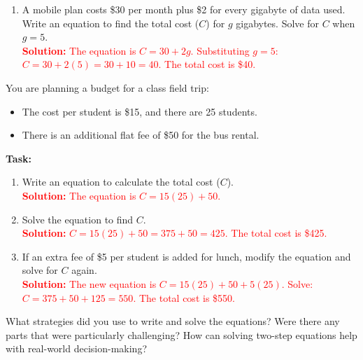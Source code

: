 \documentclass[12pt]{article}
\begin{document}
\begin{tcolorbox}[colframe=black!60, colback=white, 
coltitle=black, colbacktitle=black!15, fonttitle=\bfseries\Large, 
title=Problems, halign title=center, left=10pt, right=10pt, top=10pt, bottom=60pt]
\begin{enumerate}[start=9, itemsep=5em]
    \item A mobile plan costs \$30 per month plus \$2 for every gigabyte of data used. Write an equation to find the total cost (\(C\)) for \(g\) gigabytes. Solve for \(C\) when \(g = 5\).\\
    \textcolor{red}{\textbf{Solution:} The equation is \( C = 30 + 2g \). Substituting \( g = 5 \): \( C = 30 + 2(5) = 30 + 10 = 40 \). The total cost is \$40.}
\end{enumerate}
\end{tcolorbox}

\vspace{1em}

\begin{tcolorbox}[colframe=black!60, colback=white, 
coltitle=black, colbacktitle=black!15, fonttitle=\bfseries\Large, 
title=Performance Task: Planning a Budget, halign title=center, left=10pt, right=10pt, top=10pt, bottom=50pt]
You are planning a budget for a class field trip:
\begin{itemize}
    \item The cost per student is \$15, and there are 25 students.
    \item There is an additional flat fee of \$50 for the bus rental.
\end{itemize}
\textbf{Task:}
\begin{enumerate}[itemsep=3em]
    \item Write an equation to calculate the total cost (\(C\)).\\
    \textcolor{red}{\textbf{Solution:} The equation is \( C = 15(25) + 50 \).}

    \item Solve the equation to find \(C\).\\
    \textcolor{red}{\textbf{Solution:} \( C = 15(25) + 50 = 375 + 50 = 425 \). The total cost is \$425.}

    \item If an extra fee of \$5 per student is added for lunch, modify the equation and solve for \(C\) again.\\
    \textcolor{red}{\textbf{Solution:} The new equation is \( C = 15(25) + 50 + 5(25) \). Solve: \( C = 375 + 50 + 125 = 550 \). The total cost is \$550.}
\end{enumerate}
\end{tcolorbox}

\vspace{1em}

\begin{tcolorbox}[colframe=black!60, colback=white, 
coltitle=black, colbacktitle=black!15, fonttitle=\bfseries\Large, 
title=Reflection, halign title=center, left=10pt, right=10pt, top=10pt, bottom=80pt]
What strategies did you use to write and solve the equations? Were there any parts that were particularly challenging? How can solving two-step equations help with real-world decision-making?
\end{tcolorbox}
\end{document}
